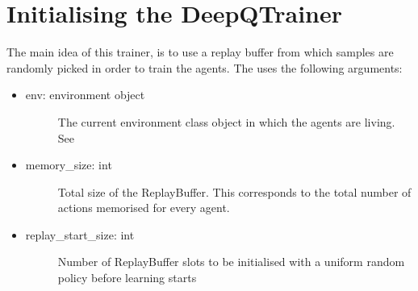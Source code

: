 \documentclass[letterpaper,10pt,english]{sphinxmanual}
\begin{document}
\section{Initialising the DeepQTrainer}
\label{\detokenize{UsingTheEnvironment:initialising-the-deepqtrainer}}
\sphinxAtStartPar
The main idea of this trainer, is to use a replay buffer from which samples are randomly picked in order to train the
agents. The  uses the following arguments:
\begin{itemize}
\item {} \begin{description}
\item[{env: environment object}] \leavevmode
\sphinxAtStartPar
The current environment class object in which the agents are living. See {\hyperref[\detokenize{UsingTheEnvironment:env}]{}}

\end{description}

\item {} \begin{description}
\item[{memory\_size: int}] \leavevmode
\sphinxAtStartPar
Total size of the ReplayBuffer. This corresponds to the total number of actions memorised for every agent.

\end{description}

\item {} \begin{description}
\item[{replay\_start\_size: int}] \leavevmode
\sphinxAtStartPar
Number of ReplayBuffer slots to be initialised with a uniform random policy before learning starts

\end{description}

\end{itemize}
\end{document}
